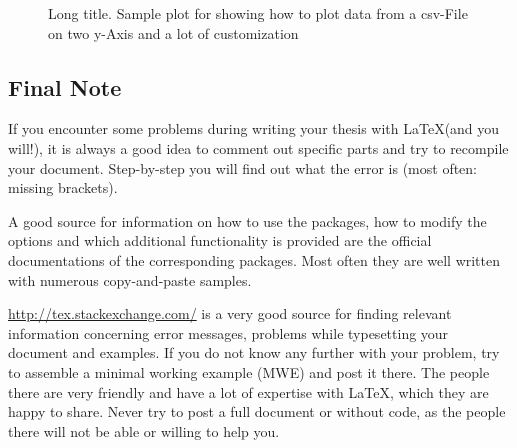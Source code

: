 \begin{figure}
	\centering
	\caption[Short title for table of figures summary.]
	{Long title. Sample plot for showing how to plot data from a csv-File on two y-Axis and a lot of customization}
	\label{Fig:Intro_Occurences}
\end{figure}
\newpage

\subsection{Final Note}
If you encounter some problems during writing your thesis with \LaTeX (and you will!), it is always a good idea to comment out specific parts and try to recompile your document. Step-by-step you will find out what the error is (most often: missing brackets).

A good source for information on how to use the packages, how to modify the options and which additional functionality is provided are the official documentations of the corresponding packages. Most often they are well written with numerous copy-and-paste samples.

\url{http://tex.stackexchange.com/} is a very good source for finding relevant information concerning error messages, problems while typesetting your document and examples. If you do not know any further with your problem, try to assemble a minimal working example (MWE) and post it there. The people there are very friendly and have a lot of expertise with \LaTeX, which they are happy to share. Never try to post a full document or without code, as the people there will not be able or willing to help you.